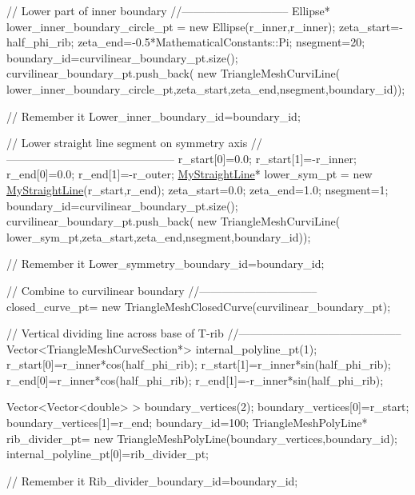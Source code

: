 \begin{DoxyCodeInclude}
  \textcolor{comment}{// Lower part of inner boundary}
  \textcolor{comment}{//-----------------------------}
  Ellipse* lower\_inner\_boundary\_circle\_pt = \textcolor{keyword}{new} Ellipse(r\_inner,r\_inner);
  zeta\_start=-half\_phi\_rib;
  zeta\_end=-0.5*MathematicalConstants::Pi;
  nsegment=20;
  boundary\_id=curvilinear\_boundary\_pt.size();
  curvilinear\_boundary\_pt.push\_back(
   \textcolor{keyword}{new} TriangleMeshCurviLine(
    lower\_inner\_boundary\_circle\_pt,zeta\_start,zeta\_end,nsegment,boundary\_id)); 
 
  \textcolor{comment}{// Remember it}
  Lower\_inner\_boundary\_id=boundary\_id;

  \textcolor{comment}{// Lower straight line segment on symmetry axis}
  \textcolor{comment}{//---------------------------------------------}
  r\_start[0]=0.0;
  r\_start[1]=-r\_inner;
  r\_end[0]=0.0;
  r\_end[1]=-r\_outer;
  \hyperlink{classMyStraightLine}{MyStraightLine}* lower\_sym\_pt = \textcolor{keyword}{new} \hyperlink{classMyStraightLine}{MyStraightLine}(r\_start,r\_end);
  zeta\_start=0.0;
  zeta\_end=1.0;
  nsegment=1;
  boundary\_id=curvilinear\_boundary\_pt.size();
  curvilinear\_boundary\_pt.push\_back(
   \textcolor{keyword}{new} TriangleMeshCurviLine(
    lower\_sym\_pt,zeta\_start,zeta\_end,nsegment,boundary\_id));
      
  \textcolor{comment}{// Remember it}
  Lower\_symmetry\_boundary\_id=boundary\_id;

  \textcolor{comment}{// Combine to curvilinear boundary}
  \textcolor{comment}{//--------------------------------}
  closed\_curve\_pt=
   \textcolor{keyword}{new} TriangleMeshClosedCurve(curvilinear\_boundary\_pt); 
 
  \textcolor{comment}{// Vertical dividing line across base of T-rib}
  \textcolor{comment}{//--------------------------------------------}
  Vector<TriangleMeshCurveSection*> internal\_polyline\_pt(1);
  r\_start[0]=r\_inner*cos(half\_phi\_rib);
  r\_start[1]=r\_inner*sin(half\_phi\_rib);
  r\_end[0]=r\_inner*cos(half\_phi\_rib);
  r\_end[1]=-r\_inner*sin(half\_phi\_rib);

  Vector<Vector<double> > boundary\_vertices(2);
  boundary\_vertices[0]=r\_start;
  boundary\_vertices[1]=r\_end;
  boundary\_id=100;
  TriangleMeshPolyLine* rib\_divider\_pt=
   \textcolor{keyword}{new} TriangleMeshPolyLine(boundary\_vertices,boundary\_id); 
  internal\_polyline\_pt[0]=rib\_divider\_pt;

  \textcolor{comment}{// Remember it}
  Rib\_divider\_boundary\_id=boundary\_id;


\end{DoxyCodeInclude}
